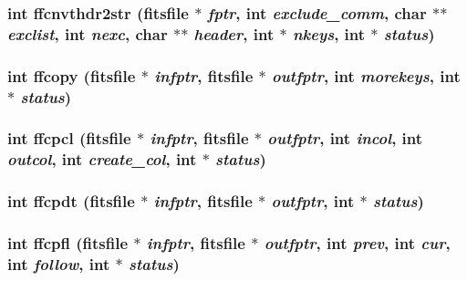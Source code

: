\subsubsection{\setlength{\rightskip}{0pt plus 5cm}int ffcnvthdr2str (\bf{fitsfile} $\ast$ {\em fptr}, int {\em exclude\_\-comm}, char $\ast$$\ast$ {\em exclist}, int {\em nexc}, char $\ast$$\ast$ {\em header}, int $\ast$ {\em nkeys}, int $\ast$ {\em status})}\label{fitsio__64_8h_d085b362bec6a758de74a33f0ae1a193}


\subsubsection{\setlength{\rightskip}{0pt plus 5cm}int ffcopy (\bf{fitsfile} $\ast$ {\em infptr}, \bf{fitsfile} $\ast$ {\em outfptr}, int {\em morekeys}, int $\ast$ {\em status})}\label{fitsio__64_8h_05f351dc381335ac165c99c10791f85d}


\subsubsection{\setlength{\rightskip}{0pt plus 5cm}int ffcpcl (\bf{fitsfile} $\ast$ {\em infptr}, \bf{fitsfile} $\ast$ {\em outfptr}, int {\em incol}, int {\em outcol}, int {\em create\_\-col}, int $\ast$ {\em status})}\label{fitsio__64_8h_c4005499502ddc26787bf95b711a56d5}


\subsubsection{\setlength{\rightskip}{0pt plus 5cm}int ffcpdt (\bf{fitsfile} $\ast$ {\em infptr}, \bf{fitsfile} $\ast$ {\em outfptr}, int $\ast$ {\em status})}\label{fitsio__64_8h_065331889b563986ac9c35c5b2767397}


\subsubsection{\setlength{\rightskip}{0pt plus 5cm}int ffcpfl (\bf{fitsfile} $\ast$ {\em infptr}, \bf{fitsfile} $\ast$ {\em outfptr}, int {\em prev}, int {\em cur}, int {\em follow}, int $\ast$ {\em status})}\label{fitsio__64_8h_6b5ccd7589659b89042159ad803ded15}


